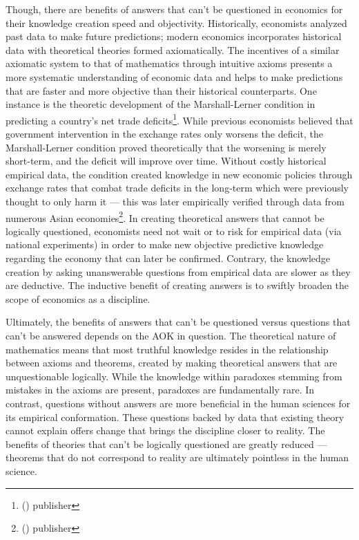 \documentclass[a4paper,12pt]{article}
\newcommand{\citefoot}[1]{\footnote{\citeall{#1}}}
\newcommand{\citeall}[1]{\citeauth{#1} \citetitle{#1} (\citeyear{#1}) publisher \citelist{#1}{publisher}}
\begin{document}
Though, there are benefits of answers that can’t be questioned in economics for their knowledge creation speed and objectivity. Historically, economists analyzed past data to make future predictions; modern economics incorporates historical data with theoretical theories formed axiomatically. The incentives of a similar axiomatic system to that of mathematics through intuitive axioms presents a more systematic understanding of economic data and helps to make predictions that are faster and more objective than their historical counterparts. One instance is the theoretic development of the Marshall-Lerner condition in predicting a country’s net trade deficits\citefoot{mlcond}. While previous economists believed that government intervention in the exchange rates only worsens the deficit, the Marshall-Lerner condition proved theoretically that the worsening is merely short-term, and the deficit will improve over time. Without costly historical empirical data, the condition created knowledge in new economic policies through exchange rates that combat trade deficits in the long-term which were previously thought to only harm it --- this was later empirically verified through data from numerous Asian economies\citefoot{hsing_2010}. In creating theoretical answers that cannot be logically questioned, economists need not wait or to risk for empirical data (via national experiments) in order to make new objective predictive knowledge regarding the economy that can later be confirmed. Contrary, the knowledge creation by asking unanswerable questions from empirical data are slower as they are deductive. The inductive benefit of creating answers is to swiftly broaden the scope of economics as a discipline.


Ultimately, the benefits of answers that can’t be questioned versus questions that can’t be answered depends on the AOK in question. The theoretical nature of mathematics means that most truthful knowledge resides in the relationship between axioms and theorems, created by making theoretical answers that are unquestionable logically. While the knowledge within paradoxes stemming from mistakes in the axioms are present, paradoxes are fundamentally rare. In contrast, questions without answers are more beneficial in the human sciences for its empirical conformation. These questions backed by data that existing theory cannot explain offers change that brings the discipline closer to reality. The benefits of theories that can’t be logically questioned are greatly reduced --- theorems that do not correspond to reality are ultimately pointless in the human science.
\end{document}
